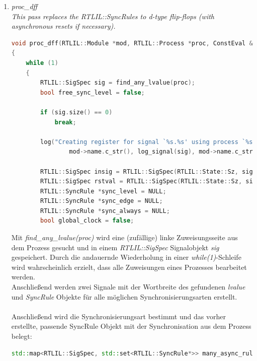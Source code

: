 \documentclass[11pt]{report}
\begin{document}
\begin{enumerate}
\begin{lstlisting}[language=C++]
	SigSnippets sigsnip;
	sigsnip.insert(&proc->root_case);

	SnippetSwCache swcache;
	swcache.snippets = &sigsnip;
	swcache.insert(&proc->root_case);

	dict<RTLIL::SwitchRule*, bool, hash_ptr_ops> swpara;

	int cnt = 0;
	for (int idx : sigsnip.snippets)
	{
		swcache.current_snippet = idx;
		RTLIL::SigSpec sig = sigsnip.sigidx[idx];

		log("%6d/%d: %s\n", ++cnt, GetSize(sigsnip.snippets), log_signal(sig));

		RTLIL::SigSpec value = signal_to_mux_tree(mod, swcache, swpara, &proc->root_case, sig, RTLIL::SigSpec(RTLIL::State::Sx, sig.size()), ifxmode);
		mod->connect(RTLIL::SigSig(sig, value));
	}
}
\end{lstlisting}
Die Hauptfunktion proc\_mux 


\item \textit{proc\_dff\\
This pass replaces the RTLIL::SyncRules to d-type flip-flops (with asynchronous resets if necessary).}
\begin{lstlisting}[language=C++]
void proc_dff(RTLIL::Module *mod, RTLIL::Process *proc, ConstEval &ce)
{
	while (1)
	{
		RTLIL::SigSpec sig = find_any_lvalue(proc);
		bool free_sync_level = false;

		if (sig.size() == 0)
			break;

		log("Creating register for signal `%s.%s' using process `%s.%s'.\n",
				mod->name.c_str(), log_signal(sig), mod->name.c_str(), proc->name.c_str());

		RTLIL::SigSpec insig = RTLIL::SigSpec(RTLIL::State::Sz, sig.size());
		RTLIL::SigSpec rstval = RTLIL::SigSpec(RTLIL::State::Sz, sig.size());
		RTLIL::SyncRule *sync_level = NULL;
		RTLIL::SyncRule *sync_edge = NULL;
		RTLIL::SyncRule *sync_always = NULL;
		bool global_clock = false;
\end{lstlisting}
Mit \textit{find\_any\_lvalue(proc)} wird eine (zufällige) linke Zuweisungsseite aus dem Prozess gesucht und in einem \textit{RTLIL::SigSpec} Signalobjekt \textit{sig} gespeichert. Durch die andauernde Wiederholung in einer \textit{while(1)}-Schleife wird wahrscheinlich erzielt, dass alle Zuweisungen eines Prozesses bearbeitet werden.\\
Anschließend werden zwei Signale mit der Wortbreite des gefundenen \textit{lvalue} und \textit{SyncRule} Objekte für alle möglichen Synchronisierungsarten erstellt.
\\
\\
Anschließend wird die Synchronisierungsart bestimmt und das vorher erstellte, passende SyncRule Objekt mit der Synchronisation aus dem Prozess belegt:
\begin{lstlisting}[language=C++]
std::map<RTLIL::SigSpec, std::set<RTLIL::SyncRule*>> many_async_rules;


\end{lstlisting}
\end{enumerate}
\end{document}
